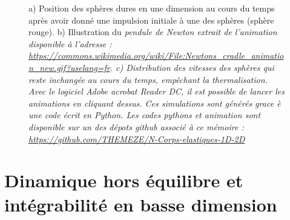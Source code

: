 \begin{figure}[H]
\begin{tikzpicture}
        
	\end{tikzpicture}
	\caption{a) Position des sphères dures en une dimension au cours du temps après avoir donné une impulsion initiale à une des sphères (sphère rouge). b) Illustration du \em{pendule de Newton} extrait de l'animation disponible à l'adresse : \url{https://commons.wikimedia.org/wiki/File:Newtons_cradle_animation_new.gif?uselang=fr}. c) Distribution des vitesses des sphères qui reste inchangée au cours du temps, empêchant la thermalisation.\\
    Avec le logiciel Adobe acrobat Reader DC, il est possible de lancer les animations en cliquant dessus. 
    Ces simulations sont générés grace è une code écrit en Python.
    Les codes pythons et animation sont disponible sur un des dépots github associé à ce mémoire : \url{https://github.com/THEMEZE/N-Corps-elastiques-1D-2D}
    }
    
	\label{fig:hard_spheres_1D_animation}
\end{figure}

\section*{Dinamique hors équilibre et intégrabilité en basse dimension}


